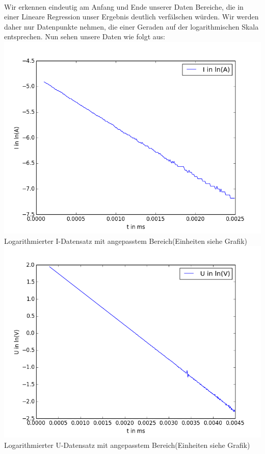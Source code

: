 \documentclass[12pt,a4paper]{article}
\begin{document}
\\ Wir erkennen eindeutig am Anfang und Ende unserer Daten Bereiche, die in einer Lineare Regression unser Ergebnis deutlich verfälschen würden. Wir werden daher nur Datenpunkte nehmen, die einer Geraden auf der logarithmischen Skala entsprechen.
Nun sehen unsere Daten wie folgt aus:\\
\includegraphics[scale=0.35]{ln(Ik)ggt.png}\\
Logarithmierter I-Datensatz mit angepasstem Bereich(Einheiten siehe Grafik)\\
\includegraphics[scale=0.35]{ln(uk)ggt.png}\\
Logarithmierter U-Datensatz mit angepasstem Bereich(Einheiten siehe Grafik)\\
\end{document}
